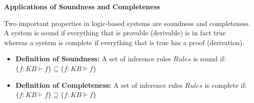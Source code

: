 \item {\bf Applications of Soundness and Completeness}

Two important properties in logic-based systems are soundness and completeness. A system is sound if everything that is provable (derivable) 
is in fact true whereas a system is complete if everything that is true has a proof (derivation).

\begin{itemize}
  \item \textbf{Definition of Soundness: } A set of inference rules $Rules$ is sound if: $\{f: KB \vdash f\} \subseteq \{f: KB \vDash f\}$
  \item \textbf{Definition of Completeness: } A set of inference rules $Rules$ is complete if: $\{f: KB \vdash f\} \supseteq \{f: KB \vDash f\}$ 
\end{itemize}


\begin{enumerate}

  
  
  
  
\end{enumerate}
